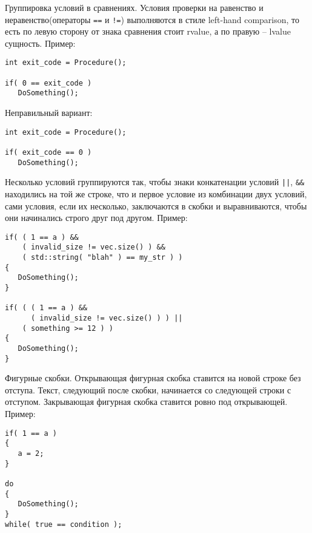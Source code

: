 \documentclass{article}
\begin{document}
\Large Группировка условий в сравнениях.
\normalsize
\vskip0.5cm
Условия проверки на равенство и неравенство(операторы \texttt{==} и \texttt{!=}) выполняются в стиле left-hand comparison, то есть по левую сторону от знака сравнения стоит rvalue, а по правую -- lvalue сущность. Пример:
\begin{lstlisting}
int exit_code = Procedure();

if( 0 == exit_code )
   DoSomething();
\end{lstlisting}

Неправильный вариант:

\begin{lstlisting}
int exit_code = Procedure();

if( exit_code == 0 )
   DoSomething();
\end{lstlisting}

Несколько условий группируются так, чтобы знаки конкатенации условий \texttt{||}, \texttt{\&\&} находились на той же строке, что и первое условие из комбинации двух условий, сами условия, если их несколько, заключаются в скобки и выравниваются, чтобы они начинались строго друг под другом. Пример:
\begin{lstlisting}
if( ( 1 == a ) &&
    ( invalid_size != vec.size() ) &&
    ( std::string( "blah" ) == my_str ) )
{
   DoSomething();
}

if( ( ( 1 == a ) &&
      ( invalid_size != vec.size() ) ) ||
    ( something >= 12 ) )
{
   DoSomething();
}  
\end{lstlisting}

\vskip0.5cm
\Large Фигурные скобки.
\normalsize
\vskip0.5cm
Открывающая фигурная скобка ставится на новой строке без отступа. Текст, следующий после скобки, начинается со следующей строки с отступом. Закрывающая фигурная скобка ставится ровно под открывающей. Пример:
\begin{lstlisting}
if( 1 == a )
{
   a = 2;
}

do
{
   DoSomething();
}
while( true == condition );
\end{lstlisting}
\end{document}
